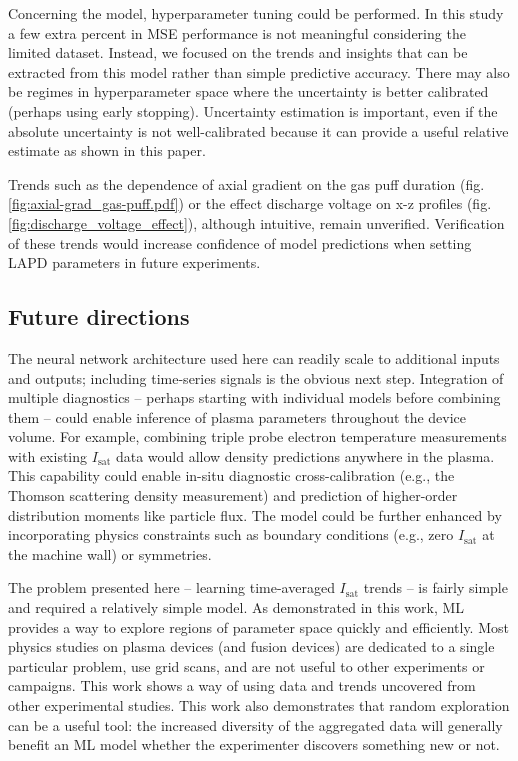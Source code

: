 Concerning the model, hyperparameter tuning could be performed. In this study a few extra percent in MSE performance is not meaningful considering the limited dataset. Instead, we focused on the trends and insights that can be extracted from this model rather than simple predictive accuracy. There may also be regimes in hyperparameter space where the uncertainty is better calibrated (perhaps using early stopping). Uncertainty estimation is important, even if the absolute uncertainty is not well-calibrated because it can provide a useful relative estimate as shown in this paper. 

Trends such as the dependence of axial gradient on the gas puff duration (fig. \ref{fig:axial-grad_gas-puff.pdf}) or the effect discharge voltage on x-z profiles (fig. \ref{fig:discharge_voltage_effect}), although intuitive, remain unverified. Verification of these trends would increase confidence of model predictions when setting LAPD parameters in future experiments.

\subsection{Future directions}

The neural network architecture used here can readily scale to additional inputs and outputs; including time-series signals is the obvious next step. Integration of multiple diagnostics -- perhaps starting with individual models before combining them -- could enable inference of plasma parameters throughout the device volume. For example, combining triple probe electron temperature measurements with existing $I_\text{sat}$ data would allow density predictions anywhere in the plasma. This capability could enable in-situ diagnostic cross-calibration (e.g., the Thomson scattering density measurement) and prediction of higher-order distribution moments like particle flux. The model could be further enhanced by incorporating physics constraints such as boundary conditions (e.g., zero $I_\text{sat}$ at the machine wall) or symmetries. 

The problem presented here -- learning time-averaged $I_\text{sat}$ trends -- is fairly simple and required a relatively simple model. As demonstrated in this work, ML provides a way to explore regions of parameter space quickly and efficiently. Most physics studies on plasma devices (and fusion devices) are dedicated to a single particular problem, use grid scans, and are not useful to other experiments or campaigns. This work shows a way of using data and trends uncovered from other experimental studies. This work also demonstrates that random exploration can be a useful tool: the increased diversity of the aggregated data will generally benefit an ML model whether the experimenter discovers something new or not.

